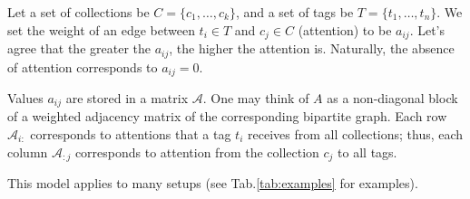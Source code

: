 \documentclass{llncs}
\begin{document}
Let a set of collections be $C = \{c_1, \dots, c_k\}$, and a set of tags be $T = \{t_1, \dots, t_n\}$.
We set the weight of an edge between $t_i \in T$ and $c_j \in C$ (attention) to be $a_{ij}$.
Let's agree that the greater the $a_{ij}$, the higher the attention is. Naturally, the absence of attention corresponds to $a_{ij} = 0$. 

Values $a_{ij}$ are stored in a matrix $\mathcal{A}$. One may think of $A$ as a non-diagonal block of a weighted adjacency matrix of the corresponding bipartite graph. Each row $\mathcal{A}_{i:}$ corresponds to attentions that a tag $t_i$ receives from all collections; thus, each column $\mathcal{A}_{:j}$ corresponds to attention from the collection $c_j$ to all tags.

This model applies to many setups (see Tab.\ref{tab:examples} for examples).
\end{document}
